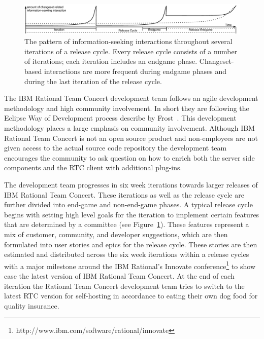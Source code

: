 \begin{figure}[t]
\centering
\includegraphics[width=\textwidth]{figures/findingProcess2}
\vspace{-20pt}\caption{The pattern of information-seeking interactions throughout several iterations of a release cycle. Every release cycle consists of a number of iterations; each iteration includes an endgame phase. Changeset-based interactions are more frequent during endgame phases and during the last iteration of the release cycle.}
\label{IterationsFig1}
\end{figure}

The IBM Rational Team Concert development team follows an agile development methodology and high community involvement.
In short they are following the Eclipse Way of Development process describe by Frost~\cite{frost:ieeesoftware:2007}.
This development methodology places a large emphasis on community involvement.
Although IBM Rational Team Concert is not an open source product and non-employees are not given access to the actual source code repository the development team encourages the community to ask question on how to enrich both the server side components and the RTC client with additional plug-ins.

The development team progresses in six week iterations towards larger releases of IBM Rational Team Concert.
These iterations as well as the release cycle are further divided into end-game and non-end-game phases.
A typical release cycle begins with setting high level goals for the iteration to implement certain features that are determined by a committee (see Figure~\ref{IterationsFig1}).
These features represent a mix of customer, community, and developer suggestions, which are then formulated into user stories and epics for the release cycle.
These stories are then estimated and distributed across the six week iterations within a release cycles with a major milestone around the IBM Rational's Innovate conference\footnote{http://www.ibm.com/software/rational/innovate} to show case the latest version of IBM Rational Team Concert. 
At the end of each iteration the Rational Team Concert development team tries to switch to the latest RTC version for self-hosting in accordance to eating their own dog food for quality insurance.

